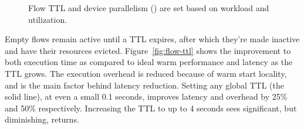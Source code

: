 \begin{figure}
  \centering
  \hfill
  \hfill 
  \caption{Flow TTL and device parallelism (\D) are set based on workload and utilization.}
  \label{fig:knobs-all}
\end{figure}


Empty flows remain active until a TTL expires, after which they're made inactive and have their resources evicted.
Figure~\ref{fig:flow-ttl} shows the improvement to both execution time as compared to ideal warm performance and latency as the TTL grows.
The execution overhead is reduced because of warm start locality, and is the main factor behind latency reduction. 
Setting any global TTL (the solid line), at even a small 0.1 seconds, improves latency and overhead by 25\% and 50\% respectively. 
Increasing the TTL to up to 4 seconds sees significant, but diminishing, returns.


